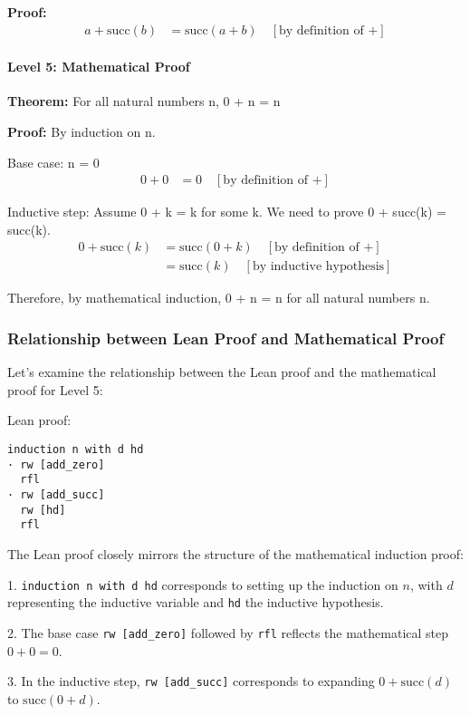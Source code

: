 \documentclass{article}
\theoremstyle{theorem}
\theoremstyle{definition}
\theoremstyle{remark}
\begin{document}
\textbf{Proof:}
\begin{align*}
a + \text{succ}(b) &= \text{succ}(a + b) \quad [\text{by definition of +}]
\end{align*}

\paragraph{Level 5: Mathematical Proof}

\textbf{Theorem:} For all natural numbers n, 0 + n = n

\textbf{Proof:} By induction on n.

Base case: n = 0
\begin{align*}
0 + 0 &= 0 \quad [\text{by definition of +}]
\end{align*}

Inductive step: Assume 0 + k = k for some k. We need to prove 0 + succ(k) = succ(k).
\begin{align*}
0 + \text{succ}(k) &= \text{succ}(0 + k) \quad [\text{by definition of +}] \\
&= \text{succ}(k) \quad [\text{by inductive hypothesis}]
\end{align*}

Therefore, by mathematical induction, 0 + n = n for all natural numbers n.

\subsubsection{Relationship between Lean Proof and Mathematical Proof}

Let's examine the relationship between the Lean proof and the mathematical proof for Level 5:

Lean proof:
\begin{lstlisting}[language=Lean]
induction n with d hd
· rw [add_zero]
  rfl
· rw [add_succ]
  rw [hd]
  rfl
\end{lstlisting}

The Lean proof closely mirrors the structure of the mathematical induction proof:

1. \texttt{induction n with d hd} corresponds to setting up the induction on \(n\), with \(d\) representing the inductive variable and \texttt{hd} the inductive hypothesis.

2. The base case \texttt{rw [add\_zero]} followed by \texttt{rfl} reflects the mathematical step \(0 + 0 = 0\).

3. In the inductive step, \texttt{rw [add\_succ]} corresponds to expanding \(0 + \text{succ}(d)\) to \(\text{succ}(0 + d)\).
\end{document}
